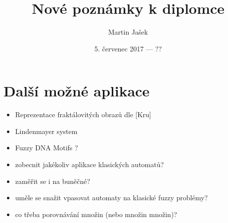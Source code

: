 \documentclass[a4paper,10pt]{article}
\title{Nové poznámky k diplomce}
\author{Martin Jašek}
\date{5. červenec 2017 --- ??}
\begin{document}
\maketitle
\tableofcontents
\newpage

\section{}

\section{Další možné aplikace}
\begin{itemize}
 \item Reprezentace fraktálovitých obrazů dle [Kru]
 \item Lindenmayer system
 \item Fuzzy DNA Motifs ?
 \item zobecnit jakékoliv aplikace klasických automatů?
 \item zaměřit se i na buněčné?
 \item uměle se snažit vpasovat automaty na klasické fuzzy problémy?
 \item co třeba porovnávání množin (nebo množin množin)?
 
\end{itemize}
\end{document}
